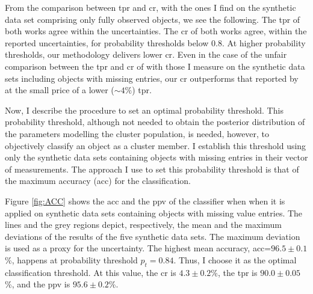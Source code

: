 From the comparison between \citet{Sarro2014} \gls{tpr} and \gls{cr}, with the ones I find on the synthetic data set comprising only fully observed objects, we see the following. The \gls{tpr} of both works agree within the uncertainties. The \gls{cr} of both works agree, within the reported uncertainties, for probability thresholds below 0.8. At higher probability thresholds, our methodology delivers lower \gls{cr}. Even in the case of the unfair comparison between the \gls{tpr} and \gls{cr} of \citet{Sarro2014} with those I measure on the synthetic data sets including objects with missing entries, our \gls{cr} outperforms that reported by \citet{Sarro2014} at the small price of a lower ($\sim 4\%$) \gls{tpr}.

Now, I describe the procedure to set an optimal probability threshold. This probability threshold, although not needed to obtain the posterior distribution of the parameters modelling the cluster population, is needed, however, to objectively classify an object as a cluster member. I establish this threshold using only the synthetic data sets containing objects with missing entries in their vector of measurements.  The approach I use to set this probability threshold is that of the maximum accuracy (\gls{acc}) for the classification. 

Figure \ref{fig:ACC} shows the \gls{acc} and the \gls{ppv} of the classifier when when it is applied on synthetic data sets containing objects with missing value entries. The lines and the grey regions depict, respectively, the mean and the maximum deviations of the results of the five synthetic data sets. The maximum deviation is used as a proxy for the uncertainty. The highest mean accuracy, \gls{acc}=$96.5\pm0.1$\%, happens at probability threshold $p_t = 0.84$. Thus, I choose it as the optimal classification threshold. At this value, the \gls{cr} is $4.3\pm0.2$\%, the \gls{tpr} is $90.0\pm0.05$\%, and the \gls{ppv} is $95.6\pm0.2$\%. 

